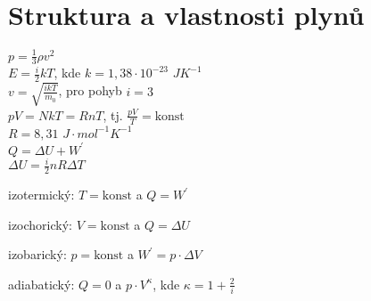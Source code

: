 \documentclass{article}
\begin{document}
\section{Struktura a vlastnosti plynů}
\begin{multicols}{2}
\noindent$p=\frac{1}{3}\rho v^2$\\
$E=\frac{i}{2}kT$, kde $k=1,38\cdot 10^{-23}$ $JK^{-1}$\\
$v=\sqrt{\frac{ikT}{m_0}}$, pro pohyb $i=3$\\
$pV=NkT=RnT$, tj. $\frac{pV}{T}=\textrm{konst}$\\
$R = 8,31$ $J\cdot mol ^{-1}K^{-1}$\\
$Q=\Delta U+W^\prime$\\
$\Delta U=\frac{i}{2}nR\Delta T$
\end{multicols}
\begin{multicols}{}
    \begin{description}
        \vspace{-0.5em}
        \setlength\itemsep{0.15em}
        \item[$i.$] izotermický: $T=\textrm{konst}$ a $Q=W^\prime$
        \item[$ii.$] izochorický: $V=\textrm{konst}$ a $Q=\Delta U$
        \item[$iii.$] izobarický: $p=\textrm{konst}$ a $W^\prime = p\cdot \Delta V$
        \item[$iv.$] adiabatický: $Q=0$ a $p\cdot V^\kappa$, kde $\kappa = 1+\frac{2}{i}$
    \end{description}
\end{multicols}
\end{document}
